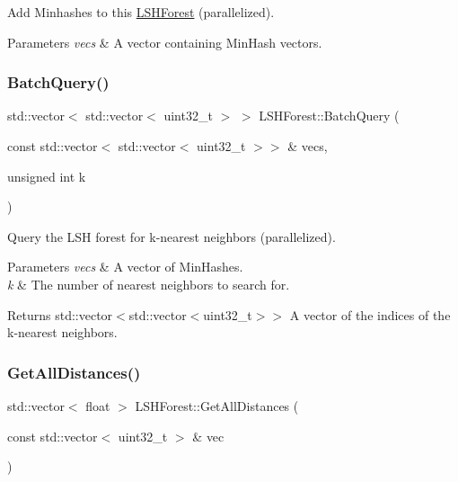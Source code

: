Add Minhashes to this \hyperlink{classLSHForest}{L\+S\+H\+Forest} (parallelized). 


\begin{DoxyParams}{Parameters}
{\em vecs} & A vector containing Min\+Hash vectors. \\
\hline
\end{DoxyParams}
\mbox{\label{classLSHForest_a23e5fd430b95580e09126ba58bde32a4}} 
\subsubsection{\texorpdfstring{Batch\+Query()}{BatchQuery()}}
{\footnotesize\ttfamily std\+::vector$<$ std\+::vector$<$ uint32\+\_\+t $>$ $>$ L\+S\+H\+Forest\+::\+Batch\+Query (\begin{DoxyParamCaption}\item[{const std\+::vector$<$ std\+::vector$<$ uint32\+\_\+t $>$$>$ \&}]{vecs,  }\item[{unsigned int}]{k }\end{DoxyParamCaption})}



Query the L\+SH forest for k-\/nearest neighbors (parallelized). 


\begin{DoxyParams}{Parameters}
{\em vecs} & A vector of Min\+Hashes. \\
\hline
{\em k} & The number of nearest neighbors to search for. \\
\hline
\end{DoxyParams}
\begin{DoxyReturn}{Returns}
std\+::vector$<$std\+::vector$<$uint32\+\_\+t$>$$>$ A vector of the indices of the k-\/nearest neighbors. 
\end{DoxyReturn}
\mbox{\label{classLSHForest_abdc3bd3357708bb58e6d957376e92f1c}} 
\subsubsection{\texorpdfstring{Get\+All\+Distances()}{GetAllDistances()}}
{\footnotesize\ttfamily std\+::vector$<$ float $>$ L\+S\+H\+Forest\+::\+Get\+All\+Distances (\begin{DoxyParamCaption}\item[{const std\+::vector$<$ uint32\+\_\+t $>$ \&}]{vec }\end{DoxyParamCaption})}



